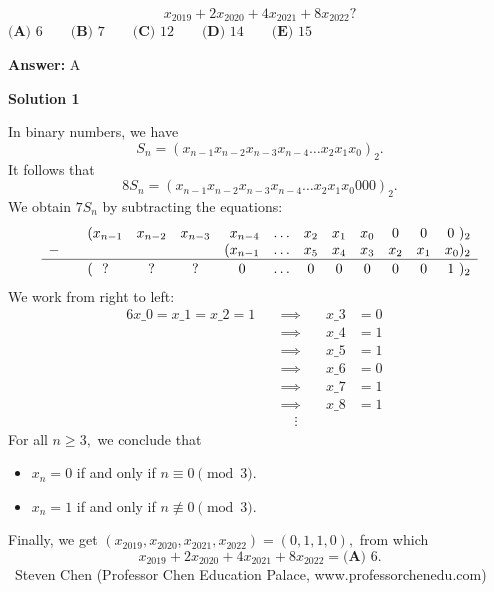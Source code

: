 \begin{enumerate}
 \[x_{2019} + 2x_{2020} + 4x_{2021} + 8x_{2022}?\]
$\textbf{(A) } 6 \qquad \textbf{(B) } 7 \qquad \textbf{(C) }12\qquad \textbf{(D) } 14\qquad \textbf{(E) }15$

 \textbf{Answer: }A



\textbf{Solution 1}

In binary numbers, we have 
 \[S_n = (x_{n-1} x_{n-2} x_{n-3} x_{n-4} \ldots x_{2} x_{1} x_{0})_2.\]It follows that 
 \[8S_n = (x_{n-1} x_{n-2} x_{n-3} x_{n-4} \ldots x_{2} x_{1} x_{0}000)_2.\]We obtain $7S_n$ by subtracting the equations:
 \[\begin{array}{clccrccccccr}   & (x_{n-1} & x_{n-2} & x_{n-3} & x_{n-4} & \ldots & x_2 & x_1 & x_0 & 0 & 0 & 0 \ )_2 \\ -\quad & & & & (x_{n-1} & \ldots & x_5 & x_4 & x_3 & x_2 & x_1 & x_0)_2 \\ \hline   & & & & & & & & & & &  \\ [-2.5ex]   & ( \ \ ?& ? & ? & 0 \ \ \ & \ldots & 0 & 0 & 0 & 0 & 0 & 1 \ )_2 \\ \end{array}\]We work from right to left:
 \begin{alignat*}{6} x\_0=x\_1=x\_2=1  \quad &\implies \quad &x\_3 &= 0& \\  \quad &\implies \quad &x\_4 &= 1& \\  \quad &\implies \quad &x\_5 &= 1& \\ \quad &\implies \quad &x\_6 &= 0& \\  \quad &\implies \quad &x\_7 &= 1& \\  \quad &\implies \quad &x\_8 &= 1& \\ \quad &\quad \vdots & & & \end{alignat*}For all $n\geq3,$ we conclude that

 
            \begin{itemize}
        \item $x_n=0$ if and only if $n\equiv 0\pmod{3}.$
            \end{itemize}
            
            \begin{itemize}
        \item $x_n=1$ if and only if $n\not\equiv 0\pmod{3}.$
            \end{itemize}
            Finally, we get $(x_{2019},x_{2020},x_{2021},x_{2022})=(0,1,1,0),$ from which 
 \[x_{2019} + 2x_{2020} + 4x_{2021} + 8x_{2022} = \boxed{\textbf{(A) } 6}.\]~Steven Chen (Professor Chen Education Palace, www.professorchenedu.com)


\end{enumerate}
